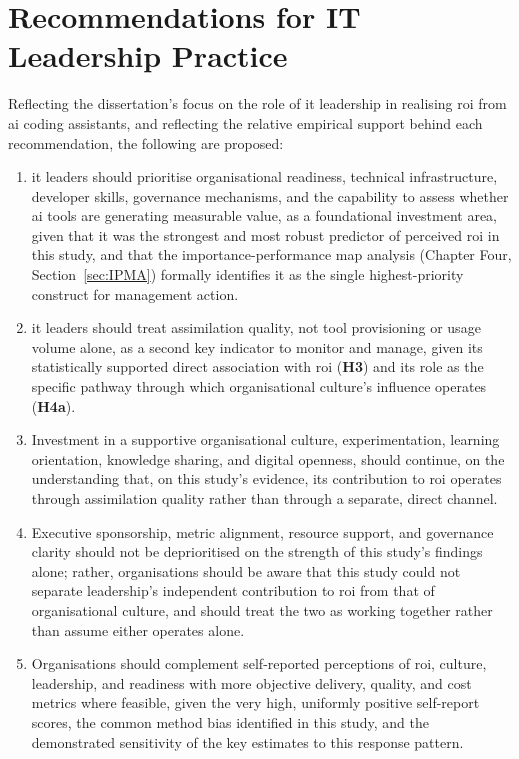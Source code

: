 \section{Recommendations for IT Leadership Practice}
\label{sec:Recommendations for IT Leadership Practice}
Reflecting the dissertation's focus on the role of \gls{it} leadership in realising \gls{roi} from \gls{ai} coding assistants, and reflecting the relative empirical support behind each recommendation, the following are proposed:
\begin{enumerate}
	\item \gls{it} leaders should prioritise organisational readiness, technical infrastructure, developer skills, governance mechanisms, and the capability to assess whether \gls{ai} tools are generating measurable value, as a foundational investment area, given that it was the strongest and most robust predictor of perceived \gls{roi} in this study, and that the importance-performance map analysis (Chapter Four, Section~\ref{sec:IPMA}) formally identifies it as the single highest-priority construct for management action.
	\item \gls{it} leaders should treat assimilation quality, not tool provisioning or usage volume alone, as a second key indicator to monitor and manage, given its statistically supported direct association with \gls{roi} (\textbf{H3}) and its role as the specific pathway through which organisational culture's influence operates (\textbf{H4a}).
	\item Investment in a supportive organisational culture, experimentation, learning orientation, knowledge sharing, and digital openness, should continue, on the understanding that, on this study's evidence, its contribution to \gls{roi} operates through assimilation quality rather than through a separate, direct channel.
	\item Executive sponsorship, metric alignment, resource support, and governance clarity should not be deprioritised on the strength of this study's findings alone; rather, organisations should be aware that this study could not separate leadership's independent contribution to \gls{roi} from that of organisational culture, and should treat the two as working together rather than assume either operates alone.
	\item Organisations should complement self-reported perceptions of \gls{roi}, culture, leadership, and readiness with more objective delivery, quality, and cost metrics where feasible, given the very high, uniformly positive self-report scores, the common method bias identified in this study, and the demonstrated sensitivity of the key estimates to this response pattern.
\end{enumerate}

